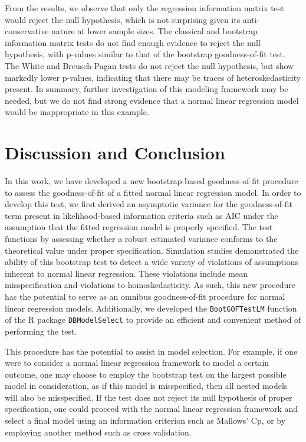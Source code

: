 \documentclass[sn-mathphys-ay]{sn-jnl}
\begin{document}
From the results, we observe that only the regression information matrix test would reject the null hypothesis, which is not surprising given its
anti-conservative nature at lower sample sizes. The classical and bootstrap information matrix tests do not find enough evidence to reject the null
hypothesis, with p-values similar to that of the bootstrap goodness-of-fit test. The White and Breusch-Pagan tests do not reject the null hypothesis,
but show markedly lower p-values, indicating that there may be traces of heteroskedasticity present. In summary, further investigation of this modeling
framework may be needed, but we do not find strong evidence that a normal linear regression model would be inappropriate in this example.

\section{Discussion and Conclusion}

In this work, we have developed a new bootstrap-based goodness-of-fit procedure to assess the goodness-of-fit of a fitted normal linear regression model. In order
to develop this test, we first derived an asymptotic variance for the goodness-of-fit term present in likelihood-based information criteria such as AIC under the assumption
that the fitted regression model is properly specified. The test functions by assessing whether a robust estimated variance conforms to the
theoretical value under proper specification. Simulation studies demonstrated the ability of this bootstrap test to detect a wide variety of violations of assumptions inherent to
normal linear regression. These violations include mean misspecification and violations to homoskedasticity. As such, this new procedure has the potential to serve as an omnibus
goodness-of-fit procedure for normal linear regression models. Additionally, we developed the \texttt{BootGOFTestLM} function of the R package \texttt{DBModelSelect} to provide
an efficient and convenient method of performing the test.

This procedure has the potential to assist in model selection. For example, if one were to consider a normal linear regression framework to model a certain outcome, one may
choose to employ the bootstrap test on the largest possible model in consideration, as if this model is misspecified, then all nested models will also be misspecified.
If the test does not reject its null hypothesis of proper specification, one could proceed with the normal linear regression framework and select a final model using
an information criterion such as Mallows' Cp, or by employing another method such as cross validation.
\end{document}
